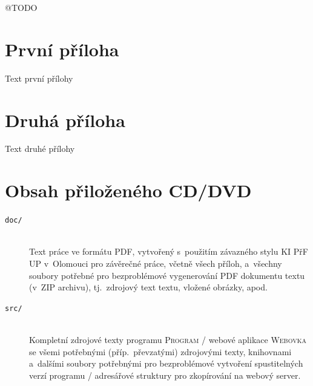 \documentclass[
  field=inf,
  biblatex,
  glossaries,
  index
]{kidiplom}
\begin{document}
\begin{kiconclusions}[english]
	@TODO
\end{kiconclusions}




\appendix

\section{První příloha}
Text první přílohy

\section{Druhá příloha}
Text druhé přílohy

\section{Obsah přiloženého CD/DVD} \label{sec:ObsahCD}

\begin{description}

\item[\texttt{doc/}] \hfill \\
  Text práce ve formátu PDF, vytvořený s~použitím závazného stylu KI
  PřF UP v~Olomouci pro závěrečné práce, včetně všech příloh,
  a~všechny soubory potřebné pro bezproblémové vygenerování PDF
  dokumentu textu (v~ZIP archivu), tj.~zdrojový text textu, vložené
  obrázky, apod.

\item[\texttt{src/}] \hfill \\
  Kompletní zdrojové texty programu \textsc{Program} / webové aplikace
  \textsc{Webovka} se všemi potřebnými (příp.~převzatými) zdrojovými
  texty, knihovnami a~dalšími soubory potřebnými pro bezproblémové
  vytvoření spustitelných verzí programu / adresářové struktury pro
  zkopírování na webový server.

\end{description}


\printglossary

\end{document}
